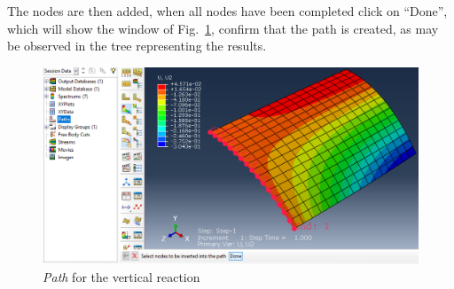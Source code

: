 \documentclass[english,a4paper,12pt]{article}
\begin{document}
\begin{enumerate}
The nodes are then added,
when all nodes have been completed click on ``Done'',
which will show the window of Fig.~\ref{fig19}, confirm that the path is created, as may be observed in the tree representing the results.
\begin{figure}[h!tp]
\centering
	\includegraphics[scale=0.45]{capturas2019/a_fig37-2.png}
  \caption{\emph{Path} for the vertical reaction}
  \label{fig19}
\end{figure}

\end{enumerate}
\end{document}
